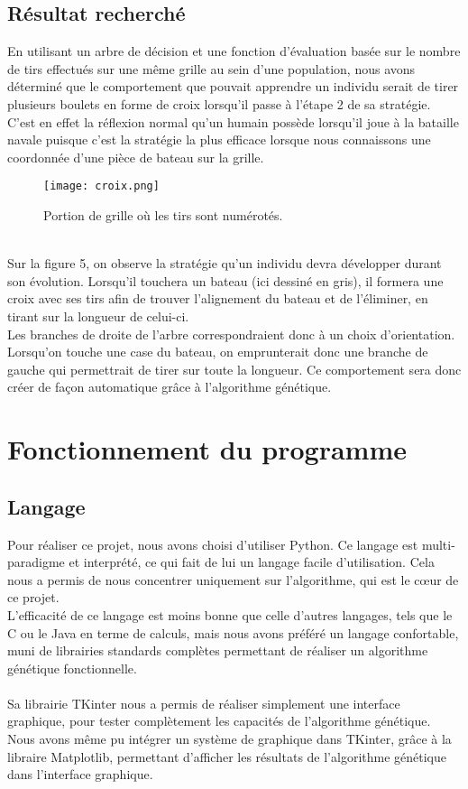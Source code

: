 \documentclass[12pt]{report}
\begin{document}
	\subsection{Résultat recherché}
	En utilisant un arbre de décision et une fonction d'évaluation basée sur le nombre de tirs effectués sur une même grille au sein d'une population, nous avons déterminé que le comportement que pouvait apprendre un individu serait de tirer plusieurs boulets en forme de croix lorsqu'il passe à l'étape 2 de sa stratégie.\\
	C'est en effet la réflexion normal qu'un humain possède lorsqu'il joue à la bataille navale puisque c'est la stratégie la plus efficace lorsque nous connaissons une coordonnée d'une pièce de bateau sur la grille.
	\begin{figure}[h]
    	\begin{center}
		\texttt{[image: croix.png]}
		\caption{Portion de grille où les tirs sont numérotés.}
		\end{center}
	\end{figure}
	\\Sur la figure 5, on observe la stratégie qu'un individu devra développer durant son évolution. Lorsqu'il touchera un bateau (ici dessiné en gris), il formera une croix avec ses tirs afin de trouver l'alignement du bateau et de l'éliminer, en tirant sur la longueur de celui-ci.\\
	Les branches de droite de l'arbre correspondraient donc à un choix d'orientation. Lorsqu'on touche une case du bateau, on emprunterait donc une branche de gauche qui permettrait de tirer sur toute la longueur. Ce comportement sera donc créer de façon automatique grâce à l'algorithme génétique.
\newpage
{}
\section{Fonctionnement du programme}
	\subsection{Langage}
	Pour réaliser ce projet, nous avons choisi d'utiliser Python. Ce langage est multi-paradigme et interprété, ce qui fait de lui un langage facile d'utilisation. Cela nous a permis de nous concentrer uniquement sur l'algorithme, qui est le cœur de ce projet.\\
	L'efficacité de ce langage est moins bonne que celle d'autres langages, tels que le C ou le Java en terme de calculs, mais nous avons préféré un langage confortable, muni de librairies standards complètes permettant de réaliser un algorithme génétique fonctionnelle.\\\\
	Sa librairie TKinter nous a permis de réaliser simplement une interface graphique, pour tester complètement les capacités de l'algorithme génétique. Nous avons même pu intégrer un système de graphique dans TKinter, grâce à la libraire Matplotlib, permettant d'afficher les résultats de l'algorithme génétique dans l'interface graphique.
\end{document}
